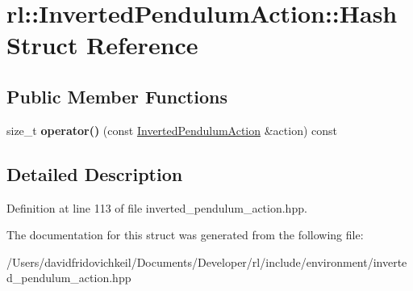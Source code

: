 \hypertarget{structrl_1_1_inverted_pendulum_action_1_1_hash}{}\section{rl\+:\+:Inverted\+Pendulum\+Action\+:\+:Hash Struct Reference}
\label{structrl_1_1_inverted_pendulum_action_1_1_hash}
\subsection*{Public Member Functions}
\begin{DoxyCompactItemize}
\item 
\hypertarget{structrl_1_1_inverted_pendulum_action_1_1_hash_af5513ab239a1fee61024a8abeb0a1c59}{}\label{structrl_1_1_inverted_pendulum_action_1_1_hash_af5513ab239a1fee61024a8abeb0a1c59} 
size\+\_\+t {\bfseries operator()} (const \hyperlink{structrl_1_1_inverted_pendulum_action}{Inverted\+Pendulum\+Action} \&action) const
\end{DoxyCompactItemize}


\subsection{Detailed Description}


Definition at line 113 of file inverted\+\_\+pendulum\+\_\+action.\+hpp.



The documentation for this struct was generated from the following file\+:\begin{DoxyCompactItemize}
\item 
/\+Users/davidfridovichkeil/\+Documents/\+Developer/rl/include/environment/inverted\+\_\+pendulum\+\_\+action.\+hpp\end{DoxyCompactItemize}
